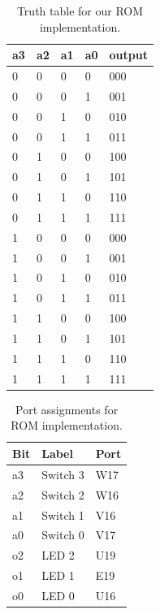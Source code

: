 \documentclass[11pt]{article}
\begin{document}
\begin{table}[H]
\begin{center}
\begin{tabular}{| l | l | l | l | l |}
	\hline
	a3 & a2 & a1 & a0 & output \\ \hline
	0 & 0 & 0 & 0 & 000 \\ \hline
	0 & 0 & 0 & 1 & 001 \\ \hline
	0 & 0 & 1 & 0 & 010 \\ \hline
	0 & 0 & 1 & 1 & 011 \\ \hline
	0 & 1 & 0 & 0 & 100 \\ \hline
	0 & 1 & 0 & 1 & 101 \\ \hline
	0 & 1 & 1 & 0 & 110 \\ \hline
	0 & 1 & 1 & 1 & 111 \\ \hline
	1 & 0 & 0 & 0 & 000 \\ \hline
	1 & 0 & 0 & 1 & 001 \\ \hline
	1 & 0 & 1 & 0 & 010 \\ \hline
	1 & 0 & 1 & 1 & 011 \\ \hline
	1 & 1 & 0 & 0 & 100 \\ \hline
	1 & 1 & 0 & 1 & 101 \\ \hline
	1 & 1 & 1 & 0 & 110 \\ \hline
	1 & 1 & 1 & 1 & 111 \\ \hline
\end{tabular}
\caption{\label{tab:romTruthTable}Truth table for our ROM implementation.}
\end{center}
\end{table}

\begin{table}[H]
\begin{center}
\begin{tabular}{| l | l | l |}
	\hline
	Bit & Label & Port \\ \hline
	a3 & Switch 3 & W17 \\ \hline
	a2 & Switch 2 & W16 \\ \hline
	a1 & Switch 1 & V16 \\ \hline
	a0 & Switch 0 & V17 \\ \hline
	o2 & LED 2 & U19 \\ \hline
	o1 & LED 1 & E19 \\ \hline
	o0 & LED 0 & U16 \\ \hline
\end{tabular}
\caption{\label{tab:romPorts}Port assignments for ROM implementation.}
\end{center}
\end{table}
\end{document}

